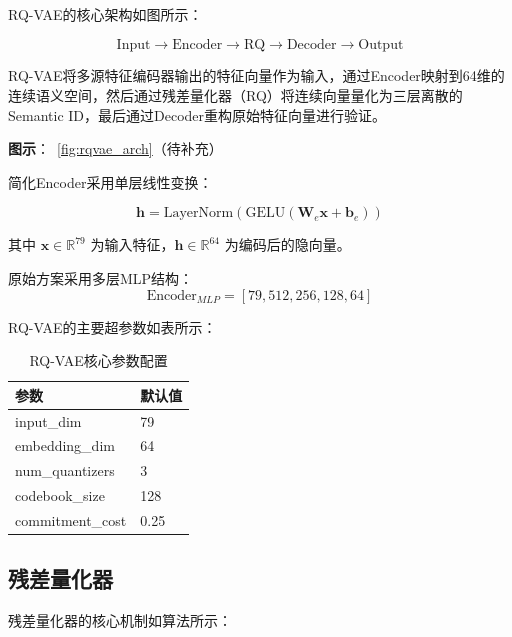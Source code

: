 RQ-VAE的核心架构如图所示：

\begin{equation}
\text{Input} \xrightarrow{} \text{Encoder} \xrightarrow{} \text{RQ} \xrightarrow{} \text{Decoder} \xrightarrow{} \text{Output}
\end{equation}

RQ-VAE将多源特征编码器输出的特征向量作为输入，通过Encoder映射到64维的连续语义空间，然后通过残差量化器（RQ）将连续向量量化为三层离散的Semantic ID，最后通过Decoder重构原始特征向量进行验证。

\textbf{图示}：\figurename~\ref{fig:rqvae_arch}（待补充）

简化Encoder采用单层线性变换：

\begin{equation}
\mathbf{h} = \text{LayerNorm}\left(\text{GELU}\left(\mathbf{W}_e \mathbf{x} + \mathbf{b}_e\right)\right)
\label{eq:encoder_simple}
\end{equation}

其中 $\mathbf{x} \in \mathbb{R}^{79}$ 为输入特征，$\mathbf{h} \in \mathbb{R}^{64}$ 为编码后的隐向量。

原始方案采用多层MLP结构：
\begin{equation}
\text{Encoder}_{MLP} = [79, 512, 256, 128, 64]
\label{eq:encoder_mlp}
\end{equation}

RQ-VAE的主要超参数如表所示：

\begin{table}[H]
\centering
\caption{RQ-VAE核心参数配置}
\label{tab:rqvae_params}
\begin{tabular}{ll}
\toprule
参数 & 默认值 \\
\midrule
input\_dim & 79 \\
embedding\_dim & 64 \\
num\_quantizers & 3 \\
codebook\_size & 128 \\
commitment\_cost & 0.25 \\
\bottomrule
\end{tabular}
\end{table}

\subsection{残差量化器}
\label{sec:residual_quantizer}

残差量化器的核心机制如算法所示：


